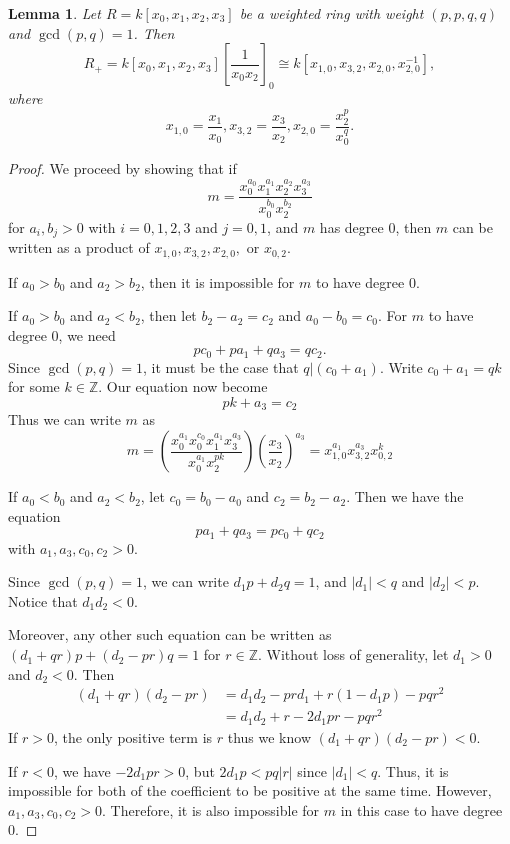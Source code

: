 \documentclass{article}
\newcommand{\Z}{\mathbb{Z}}
\newtheorem{lemma}[theorem]{Lemma}
\theoremstyle{definition}
\theoremstyle{definition}
\theoremstyle{remark}
\begin{document}
\begin{lemma}
Let $R = k\left[x_0, x_1, x_2, x_3\right]$ be a weighted ring with weight $(p,p,q,q)$ and $\gcd(p, q) = 1$. Then \[R_+ = k\left[x_0, x_1, x_2, x_3\right]\left[\frac{1}{x_0x_2} \right]_0 \cong k[x_{1,0}, x_{3,2}, x_{2, 0}, x_{2, 0}^{-1}],\] where \[x_{1,0} = \frac{x_1}{x_0}, x_{3,2} = \frac{x_3}{x_2}, x_{2,0} = \frac{x_2^p}{x_0^q}.\]
\end{lemma}

\begin{proof}
We proceed by showing that if \[m = \frac{x_0^{a_0}x_1^{a_1}x_2^{a_2}x_3^{a_3}}{x_0^{b_0}x_2^{b_2}}\] for $a_i, b_j > 0$ with $i = 0, 1,2,3$ and $j = 0, 1$, and $m$ has degree $0$, then $m$ can be written as a product  of $x_{1,0}, x_{3,2}, x_{2,0}, \text{ or } x_{0,2}$.

If $a_0 > b_0$ and $a_2 > b_2$, then it is impossible for $m$ to have degree $0$.

If $a_0 > b_0$ and $a_2 < b_2$, then let $b_2 - a_2 = c_2$ and $a_0 - b_0 = c_0$. For $m$ to have degree $0$, we need 
\[pc_0 + pa_1 + qa_3 = qc_2.\] 
Since $\gcd(p, q) = 1$, it must be the case that $q | (c_0 + a_1)$. Write $c_0 + a_1 = qk$ for some $k \in \Z$. Our equation now become 
\[pk + a_3 = c_2\] Thus we can write $m$ as 
\[m = \left( \frac{x_0^{a_1}x_0^{c_0} x_1^{a_1} x_3^{a_3}}{x_0^{a_1}x_2^{pk}}\right) \left( \frac{x_3}{x_2}\right)^{a_3}  = x_{1,0}^{a_1} x_{3,2}^{a_3} x_{0,2}^{k}\]

If $a_0 < b_0$ and $a_2 < b_2$, let $c_0 = b_0 - a_0$ and $c_2 = b_2 - a_2$. Then we have the equation 
\[pa_1 + qa_3 = pc_0 + qc_2\] with $a_1, a_3, c_0, c_2 > 0$.

Since $\gcd(p, q) = 1$, we can write $d_1 p + d_2 q = 1$, and $|d_1|  < q$ and $|d_2| < p$. Notice that  $d_1d_2 < 0$. 

Moreover, any other such equation can be written as $(d_1 + qr)p +  (d_2 - pr)q = 1$ for $r \in \Z$. Without loss of generality, let $d_1 > 0$ and $d_2 < 0$. Then 
\begin{align*}
(d_1 + qr)(d_2 -pr) &= d_1d_2 - prd_1 + r(1-d_1p) - pqr^2 \\
&= d_1d_2 + r - 2d_1pr - pqr^2
\end{align*}
If $r > 0$, the only positive term is $r$ thus we know $(d_1 + qr)(d_2 -pr) < 0$. 

If $r < 0$, we have $-2d_1 pr > 0$, but $2d_1p < pq|r|$ since $|d_1| < q$. Thus, it is impossible for both of the coefficient to be positive at the same time. However, $a_1, a_3, c_0, c_2 > 0$. Therefore, it is also impossible for $m$ in this case to have degree $0$.
\end{proof}
\end{document}
